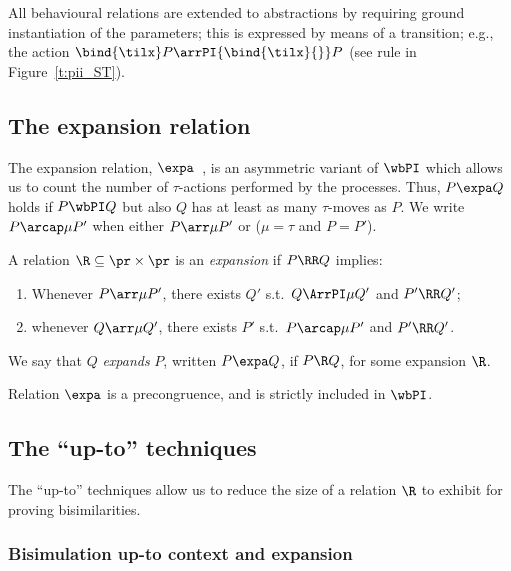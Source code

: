 All behavioural relations are extended to abstractions by requiring ground
instantiation of the parameters; this is expressed by means of a transition; e.g., the action 
$ \bind{\tilx} P \arrPI {\bind{\tilx}{}}  P$ (see rule  {} in Figure~\ref{t:pii_ST}). 


\subsection{The expansion relation}


The expansion relation, $\expa$~\cite{SaWabook}, 
is an asymmetric variant of 
$\wbPI$  which allows us to  count the number of $\tau$-actions
performed by the processes. 
Thus, $P \expa Q$ holds if $P \wbPI
Q$ but also $Q $ has at least as many $\tau$-moves as $P$. 
We write $P \arcap\mu P'$  
when either $P \arr\mu P'$ or ($\mu =\tau$ and
$P=P'$).

\begin{definition}[expansion]
  A relation $\R \subseteq   \pr \times \pr $ 
  is an {\em expansion } if $P \RR Q$
  implies:
  \begin{enumerate}
  \item  Whenever 
  $P \arr\mu P'$,    
  there exists  $Q' $  s.t.\ $Q \ArrPI\mu Q'$ 
  and $P'  \RR  Q'$;
  \item whenever $Q \arr\mu Q'$, 
  there exists  $P' $  s.t.\ $P \arcap\mu P'$ 
  and $P'  \RR  Q'$.
  \end{enumerate}
  \noindent
  We say that $Q$  {\em expands } $P$, written
  $P \expa  Q$, 
  if $P  \R  Q$,  for some expansion $ \R $.   
\end{definition} 


Relation $\expa$ is a precongruence, and  is
strictly included in $\wbPI$.  
\subsection{The ``up-to'' techniques}
\label{ss:upto}
The ``up-to'' techniques allow us to reduce
the size of a relation $\R$ to exhibit for proving bisimilarities.

\subsubsection{Bisimulation up-to context and expansion}

